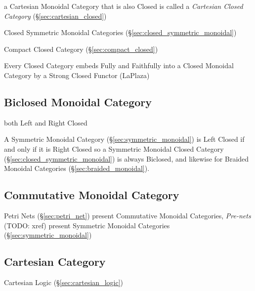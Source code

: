 a Cartesian Monoidal Category that is also Closed is called a \emph{Cartesian
  Closed Category} (\S\ref{sec:cartesian_closed})

\fist Closed Symmetric Monoidal Categories
(\S\ref{sec:closed_symmetric_monoidal})

Compact Closed Category (\S\ref{sec:compact_closed})

Every Closed Category embeds Fully and Faithfully into a Closed
Monoidal Category by a Strong Closed Functor (LaPlaza)



\subsection{Biclosed Monoidal Category}\label{sec:biclosed_monoidal}

both Left and Right Closed

A Symmetric Monoidal Category (\S\ref{sec:symmetric_monoidal}) is Left
Closed if and only if it is Right Closed so a Symmetric Monoidal
Closed Category (\S\ref{sec:closed_symmetric_monoidal}) is always
Biclosed, and likewise for Braided Monoidal Categories
(\S\ref{sec:braided_monoidal}).



\subsection{Commutative Monoidal Category}\label{sec:commuatative_monoidal}

Petri Nets (\S\ref{sec:petri_net}) present Commutative Monoidal Categories,
\emph{Pre-nets} (TODO: xref) present Symmetric Monoidal Categories
(\S\ref{sec:symmetric_monoidal})



\subsection{Cartesian Category}\label{sec:cartesian_category}

Cartesian Logic (\S\ref{sec:cartesian_logic})

